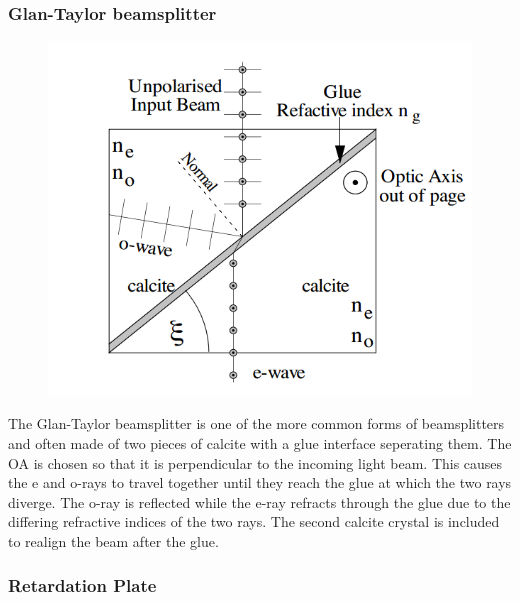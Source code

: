 \subsubsection{Glan-Taylor beamsplitter}
\begin{minipage}{0.47\linewidth}
	\begin{figure}[H]
	\includegraphics[scale=0.7]{Photonics/beamsplitter}
	\end{figure}
\end{minipage}
\begin{minipage}{0.47\linewidth}
	The Glan-Taylor beamsplitter is one of the more common forms of beamsplitters and often made of two pieces of calcite with a glue interface seperating them.  
	The OA is chosen so that it is perpendicular to the incoming light beam. 
	This causes the e and o-rays to travel together until they reach the glue at which the two rays diverge. 
	The o-ray is reflected while the e-ray refracts through the glue due to the differing refractive indices of the two rays.
	The second calcite crystal is included to realign the beam after the glue.
\end{minipage}
\subsubsection{Retardation Plate}

 


